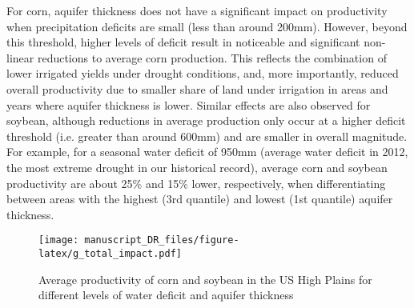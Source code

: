 \documentclass[
]{article}
\begin{document}
For corn, aquifer thickness does not have a significant impact on  productivity when precipitation deficits are small (less than around 200mm). However, beyond this threshold, higher levels of deficit result in noticeable and significant non-linear reductions to average corn production. This reflects the combination of lower irrigated yields under drought conditions, and, more importantly, reduced overall productivity due to smaller share of land under irrigation in areas and years where aquifer thickness is lower. Similar effects are also observed for soybean, although reductions in average production only occur at a higher deficit threshold (i.e. greater than around 600mm) and are smaller in overall magnitude. For example, for a seasonal water deficit of 950mm (average water deficit in 2012, the most extreme drought in our historical record), average corn and soybean productivity are about 25\% and 15\% lower, respectively, when differentiating between areas with the highest (3rd quantile) and lowest (1st quantile) aquifer thickness.  


\begin{figure}
{\centering \texttt{[image: manuscript\_DR\_files/figure-latex/g\_total\_impact.pdf]} 
}

\caption{Average productivity of corn and soybean in the US High Plains for different levels of water deficit and aquifer thickness}\label{fig:tot-impact}
\end{figure}
\end{document}
